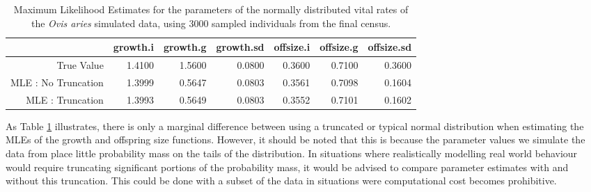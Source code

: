 \documentclass[a4paper,12pt]{article}
\begin{document}
\vspace{0.6cm}

\begin{table}[ht]
\centering
\begin{tabular}{rrrrrrr}
  \hline
 & \textbf{growth.i} & \textbf{growth.g} & \textbf{growth.sd} & \textbf{offsize.i} & \textbf{offsize.g} & \textbf{offsize.sd} \\ 
  \hline
True Value & 1.4100 & 1.5600 & 0.0800 & 0.3600 & 0.7100 & 0.3600 \\ 
  MLE : No Truncation & 1.3999 & 0.5647 & 0.0803 & 0.3561 & 0.7098 & 0.1604 \\ 
  MLE : Truncation & 1.3993 & 0.5649 & 0.0803 & 0.3552 & 0.7101 & 0.1602 \\ 
   \hline
\end{tabular}
\caption{\label{OvisTruncPars}Maximum Likelihood Estimates for the parameters of the normally distributed vital rates of the \textit{Ovis aries} simulated data, using 3000 sampled individuals from the final census.}
\end{table}

As Table \ref{OvisTruncPars} illustrates, there is only a marginal difference between using a truncated or typical normal distribution when estimating the MLEs of the growth and offspring size functions. However, it should be noted that this is because the parameter values we simulate the data from place little probability mass on the tails of the distribution. In situations where realistically modelling real world behaviour would require truncating significant portions of the probability mass, it would be advised to compare parameter estimates with and without this truncation. This could be done with a subset of the data in situations were computational cost becomes prohibitive.
\end{document}
